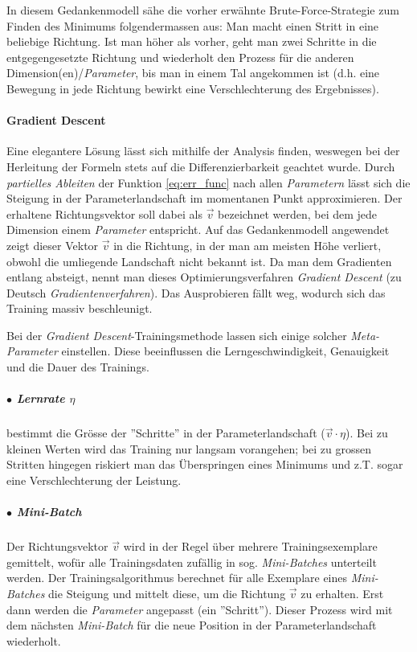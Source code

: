 In diesem Gedankenmodell sähe die vorher erwähnte Brute-Force-Strategie zum Finden des Minimums folgendermassen aus: Man macht einen Stritt in eine beliebige Richtung. Ist man höher als vorher, geht man zwei Schritte in die entgegengesetzte Richtung und wiederholt den Prozess für die anderen Dimension(en)/\textit{Parameter}, bis man in einem Tal angekommen ist (d.h. eine Bewegung in jede Richtung bewirkt eine Verschlechterung des Ergebnisses).

\paragraph{Gradient Descent}\label{cha:theo:backprop:gd} Eine elegantere Lösung lässt sich mithilfe der Analysis finden, weswegen bei der Herleitung der Formeln stets auf die Differenzierbarkeit geachtet wurde. Durch \textit{partielles Ableiten} der Funktion \ref{eq:err_func} nach allen \textit{Parametern} lässt sich die Steigung in der Parameterlandschaft im momentanen Punkt approximieren. Der erhaltene Richtungsvektor soll dabei als $\vec{v}$ bezeichnet werden, bei dem jede Dimension einem \textit{Parameter} entspricht. Auf das Gedankenmodell angewendet zeigt dieser Vektor $\vec{v}$ in die Richtung, in der man am meisten Höhe verliert, obwohl die umliegende Landschaft nicht bekannt ist. Da man dem Gradienten entlang absteigt, nennt man dieses Optimierungsverfahren \textit{Gradient Descent} (zu Deutsch \textit{Gradientenverfahren}). Das Ausprobieren fällt weg, wodurch sich das Training massiv beschleunigt.

Bei der \textit{Gradient Descent}-Trainingsmethode lassen sich einige solcher \textit{Meta-Parameter} einstellen. Diese beeinflussen die Lerngeschwindigkeit, Genauigkeit und die Dauer des Trainings.

\subparagraph{$\bullet$ Lernrate $\eta$} bestimmt die Grösse der ''Schritte'' in der Parameterlandschaft ($\vec{v} \cdot \eta$). Bei zu kleinen Werten wird das Training nur langsam vorangehen; bei zu grossen Stritten hingegen riskiert man das Überspringen eines Minimums und z.T. sogar eine Verschlechterung der Leistung. 

\subparagraph{$\bullet$ Mini-Batch} Der Richtungsvektor $\vec{v}$ wird in der Regel über mehrere Trainingsexemplare gemittelt, wofür alle Trainingsdaten zufällig in sog. \textit{Mini-Batches} unterteilt werden. Der Trainingsalgorithmus berechnet für alle Exemplare eines \textit{Mini-Batches} die Steigung und mittelt diese, um die Richtung $\vec{v}$ zu erhalten. Erst dann werden die \textit{Parameter} angepasst (ein ''Schritt''). Dieser Prozess wird mit dem nächsten \textit{Mini-Batch} für die neue Position in der Parameterlandschaft wiederholt.

